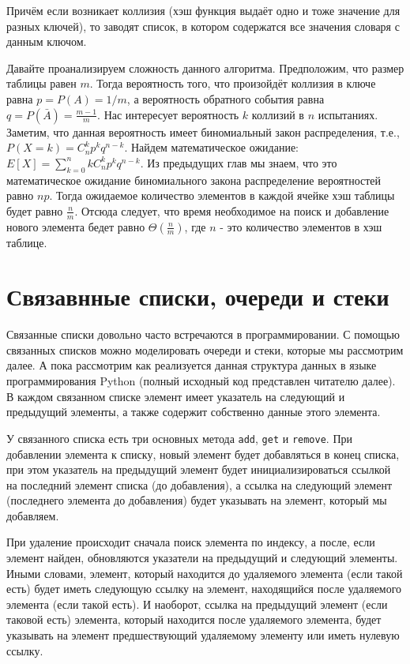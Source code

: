 Причём если возникает коллизия (хэш функция выдаёт одно и тоже значение для разных 
ключей), то заводят список, в котором содержатся все значения словаря с данным ключом.

Давайте проанализируем сложность данного алгоритма. Предположим, что 
размер таблицы равен $m$. Тогда вероятность того, что произойдёт коллизия в 
ключе равна $p=P(A)=1/m$, а вероятность обратного события равна $q=P(\bar{A})=\frac{m-1}{m}$.
Нас интересует вероятность $k$ коллизий в $n$ испытаниях. Заметим, что данная вероятность 
имеет биномиальный закон распределения, т.е., $P(X=k) = C_n^kp^kq^{n-k}$. 
Найдем математическое ожидание: $E[X]=\sum_{k=0}^nkC_n^kp^kq^{n-k}$. Из 
предыдущих глав мы знаем, что это математическое ожидание биномиального
закона распределение вероятностей равно $np$.
Тогда ожидаемое количество элементов в каждой ячейке хэш таблицы будет 
равно $\frac{n}{m}$. Отсюда следует, что время необходимое на поиск 
и добавление нового элемента бедет равно $\Theta(\frac{n}{m})$,
где $n$ - это количество элементов в хэш таблице.

\section{Связавнные списки, очереди и стеки}

Связанные списки довольно часто встречаются в программировании. 
С помощью связанных списков можно моделировать очереди и стеки,
которые мы рассмотрим далее. А пока рассмотрим как реализуется 
данная структура данных в языке программирования Python 
(полный исходный код представлен читателю далее). В каждом 
связанном списке элемент имеет указатель на следующий 
и предыдущий элементы, а также содержит собственно данные этого элемента.

У связанного списка есть три основных метода \texttt{add}, 
\texttt{get} и \texttt{remove}. 
При добавлении элемента к списку, новый элемент будет добавляться в конец списка,
при этом указатель на предыдущий элемент будет инициализироваться 
ссылкой на последний элемент списка (до добавления), а ссылка на следующий 
элемент (последнего элемента до добавления) будет 
указывать на элемент, который мы добавляем.

При удаление происходит сначала поиск элемента по индексу, 
а после, если элемент найден, обновляются указатели на предыдущий 
и следующий элементы. Иными словами, элемент, который находится 
до удаляемого элемента (если такой есть) будет иметь следующую ссылку 
на элемент, находящийся после удаляемого элемента (если такой есть). И наоборот, 
ссылка на предыдущий элемент (если таковой есть) элемента, который 
находится после удаляемого элемента, будет указывать 
на элемент предшествующий удаляемому элементу или иметь нулевую ссылку. 

